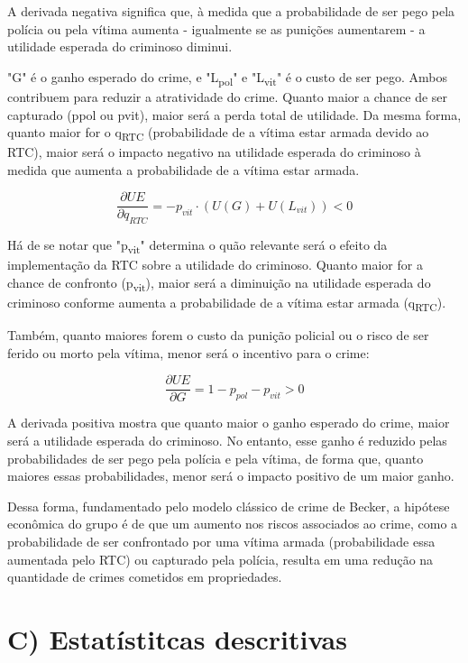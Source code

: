 \documentclass[12pt]{article}
\begin{document}
A derivada negativa significa que, à medida que a probabilidade de ser
pego pela polícia ou pela vítima aumenta - igualmente se as punições
aumentarem - a utilidade esperada do criminoso diminui.

"G" é o ganho esperado do crime, e "L\textsubscript{pol}" e "L\textsubscript{vit}" é o custo de
ser pego. Ambos contribuem para reduzir a atratividade do crime. Quanto
maior a chance de ser capturado (ppol ou pvit), maior será a perda total
de utilidade. Da mesma forma, quanto maior for o q\textsubscript{RTC}
(probabilidade de a vítima estar armada devido ao RTC), maior será o
impacto negativo na utilidade esperada do criminoso à medida que aumenta
a probabilidade de a vítima estar armada.

\[\frac{\partial UE}{\partial q_{RTC}} = - p_{vit} \cdot \left( U(G) + U\left( L_{vit} \right) \right) < 0\]

Há de se notar que "p\textsubscript{vit}" determina o quão relevante será o
efeito da implementação da RTC sobre a utilidade do criminoso. Quanto
maior for a chance de confronto (p\textsubscript{vit}), maior será a diminuição na
utilidade esperada do criminoso conforme aumenta a probabilidade de a
vítima estar armada (q\textsubscript{RTC}).

Também, quanto maiores forem o custo da punição policial ou o risco de
ser ferido ou morto pela vítima, menor será o incentivo para o crime:

\[\frac{\partial UE}{\partial G} = 1 - p_{pol} - p_{vit} > 0\]

A derivada positiva mostra que quanto maior o ganho esperado do crime,
maior será a utilidade esperada do criminoso. No entanto, esse ganho é
reduzido pelas probabilidades de ser pego pela polícia e pela vítima, de
forma que, quanto maiores essas probabilidades, menor será o impacto
positivo de um maior ganho.

Dessa forma, fundamentado pelo modelo clássico de crime de Becker, a
hipótese econômica do grupo é de que um aumento nos riscos associados ao
crime, como a probabilidade de ser confrontado por uma vítima armada
(probabilidade essa aumentada pelo RTC) ou capturado pela polícia,
resulta em uma redução na quantidade de crimes cometidos em
propriedades.\\


\section*{C) Estatístitcas descritivas}
\end{document}
